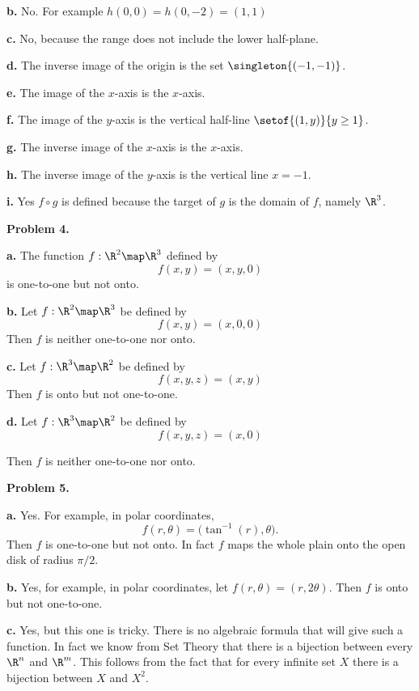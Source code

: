 \documentclass[oneside,12pt]{amsart}
\begin{document}
\medskip

\textbf{b.} No. For example $h(0,0) = h(0, -2) = (1, 1)$


\textbf{c.} No, because the range does not include the lower half-plane.

\textbf{d.} The inverse image of the origin is the set $\singleton{(-1, -1)}$.

\textbf{e.} The image of the $x$-axis is the $x$-axis.


\textbf{f.} The image of the $y$-axis is the vertical half-line
$\setof{(1, y)}{y\geq 1}$.

\textbf{g.} The inverse image of the $x$-axis is the $x$-axis.

\textbf{h.} The inverse image of the $y$-axis is the vertical line $x=-1$.

\textbf{i.} Yes $f \circ g$ is defined because the target of $g$ is the domain
of $f$, namely $\R^3$.

\medskip

\textbf{Problem 4.}

\textbf{a.} The function $f:\R^2\map\R^3$ defined by
$$f(x,y) = (x, y, 0 )$$
is one-to-one but not onto.

\textbf{b.} Let $f:\R^2\map\R^3$ be defined by
$$f(x,y) = (x, 0, 0)$$
Then $f$ is neither one-to-one nor onto.

\textbf{c.} Let $f:\R^3\map\R^2$ be defined by
$$f(x,y, z) = (x, y)$$
Then $f$ is onto but not one-to-one.

\bigskip

\textbf{d.} Let $f:\R^3\map\R^2$ be defined by
$$f(x,y, z) = (x, 0)$$

Then $f$ is neither one-to-one nor onto.


\medskip

\textbf{Problem 5.}

\smallskip

\textbf{a.} Yes. For example, in polar coordinates,
$$f(r,\theta) = \big( \tan^{-1}(r), \theta \big).$$
Then $f$ is one-to-one but not onto. In fact $f$ maps the whole plain onto
the open disk of radius $\pi/2$.


\textbf{b.} Yes, for example, in polar coordinates, let
$f(r,\theta) = (r, 2\theta)$. Then $f$ is onto but not one-to-one.


\textbf{c.} Yes, but this one is tricky. There is no algebraic formula that
will give such a function. In fact we know from Set Theory that there is a
bijection between every $\R^n$ and $\R^m$. This follows from the fact that
for every infinite set $X$ there is a bijection between $X$ and $X^2$.
\end{document}

